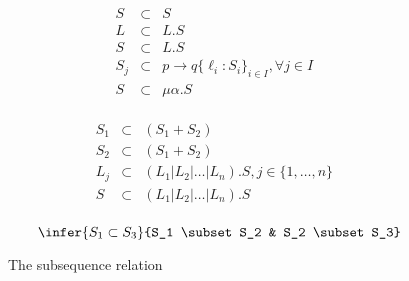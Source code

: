 \begin{figure}
  \begin{center}
    \begin{minipage}{0.48\textwidth}
      $$\begin{array}{lclr}
          S   & \subset & S                                                     & \\
          L   & \subset & L.S                                                   & \\
          S   & \subset & L.S                                                   & \\
          S_j & \subset & p\rightarrow q\{\ell_i: S_i\}_{i\in I},\forall j\in I & \\
          S   & \subset & \mu\alpha.S                                           & \\
        \end{array}$$
    \end{minipage}
    \hfill
    \begin{minipage}{0.48\textwidth}
      $$\begin{array}{lclr}
          S_1 & \subset & (S_1 + S_2)                                & \\
          S_2 & \subset & (S_1 + S_2)                                & \\
          L_j & \subset & (L_1|L_2|\ldots|L_n).S, j\in\{1,\ldots,n\} & \\
          S   & \subset & (L_1|L_2|\ldots|L_n).S                     & \\
        \end{array}$$
    \end{minipage}
  \end{center}

  $$\infer{S_1 \subset S_3}{S_1 \subset S_2 & S_2 \subset S_3}
  $$

  \caption{The subsequence relation}
  \label{rules:subsequence}
\end{figure}


